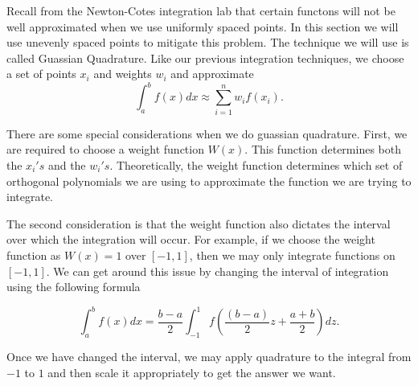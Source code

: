 
\label{Lab:GaussQuad}

Recall from the Newton-Cotes integration lab that certain functons will not be well approximated when we use uniformly spaced points.  In this section we will use unevenly spaced points to mitigate this problem. The technique we will use is called Guassian Quadrature.  Like our previous integration techniques, we choose a set of points $x_i$ and weights $w_i$ and approximate
\[
\int_{a}^b f(x) dx \approx \sum_{i=1}^n w_if(x_i).
\]

There are some special considerations when we do guassian quadrature.  First, we are required to choose a weight function $W(x)$.  This function determines both the $x_i's$ and the $w_i's$.  Theoretically, the weight function determines which set of orthogonal polynomials we are using to approximate the function we are trying to integrate.

The second consideration is that the weight function also dictates the interval over which the integration will occur.  For example, if we choose the weight function as $W(x) = 1$ over $[-1,1]$, then we may only integrate functions on $[-1,1]$.  We can get around this issue by changing the interval of integration using the following formula

\[
\int_a^b f(x) dx = \frac{b-a}{2}\int_{-1}^1 f(\frac{(b-a)}{2}z + \frac{a+b}{2})dz.
\]

Once we have changed the interval, we may apply quadrature to the integral from $-1$ to $1$ and then scale it appropriately to get the answer we want.

